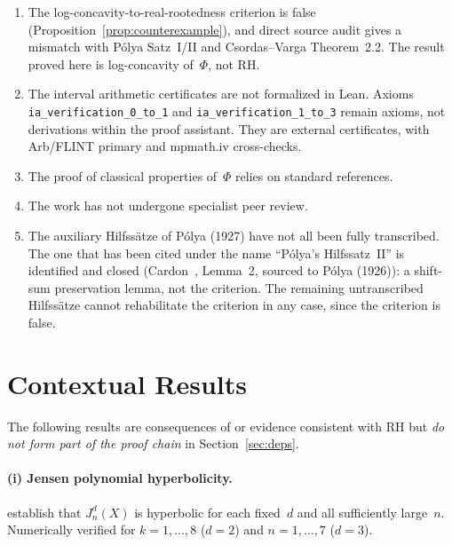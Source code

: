 \documentclass[11pt]{article}
\theoremstyle{definition}
\theoremstyle{remark}
\begin{document}
\begin{enumerate}[leftmargin=2em,itemsep=2pt]
\item The log-concavity-to-real-rootedness criterion is false
  (Proposition~\ref{prop:counterexample}), and direct source audit gives
  a mismatch with P\'{o}lya Satz~I/II and Csordas--Varga Theorem~2.2.
  The result proved here is log-concavity of~$\Phi$, not RH.
\item The interval arithmetic certificates are not formalized in Lean.
  Axioms \texttt{ia\_verification\_0\_to\_1} and \texttt{ia\_verification\_1\_to\_3}
  remain axioms, not derivations within the proof assistant.
  They are external certificates, with Arb/FLINT primary and mpmath.iv cross-checks.
\item The proof of classical properties of~$\Phi$ relies on standard references.
\item The work has not undergone specialist peer review.
\item The auxiliary Hilfss\"{a}tze of P\'{o}lya (1927) have not all been
  fully transcribed.
  The one that has been cited under the name ``P\'{o}lya's Hilfssatz~II''
  is identified and closed (Cardon~\cite{cardon2005}, Lemma~2, sourced to
  P\'{o}lya (1926)): a shift-sum preservation lemma, not the criterion.
  The remaining untranscribed Hilfss\"{a}tze cannot rehabilitate the
  criterion in any case, since the criterion is false.
\end{enumerate}




\appendix

\section{Contextual Results}\label{sec:context}

The following results are consequences of or evidence consistent with RH but
\emph{do not form part of the proof chain} in Section~\ref{sec:deps}.

\paragraph{(i) Jensen polynomial hyperbolicity.}
\cite{griffin2019} establish that $J^d_n(X)$ is hyperbolic for each fixed~$d$
and all sufficiently large~$n$.
Numerically verified for $k = 1,\ldots,8$ ($d=2$) and $n = 1,\ldots,7$ ($d=3$).
\end{document}
